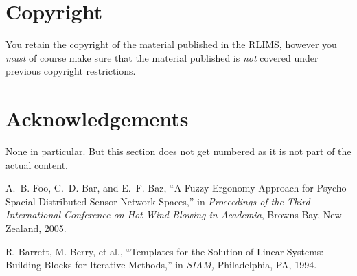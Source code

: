 \documentclass[a4paper,twoside]{arlims}
\begin{document}
\section{Copyright}
\label{sect:Copyright}

You retain the copyright of the material published in the RLIMS,
however you \emph{must} of course make sure that the material
published is \emph{not} covered under previous copyright restrictions.

\section*{Acknowledgements}

None in particular. But this section does not get numbered as it is
not part of the actual content.


\begin{thebibliography}{10}

  A.~B. Foo, C.~D. Bar, and E.~F. Baz, ``{A Fuzzy Ergonomy Approach for
  Psycho-Spacial Distributed Sensor-Network Spaces,}''
  in \emph{Proceedings of the Third International Conference on
  Hot Wind Blowing in Academia}, Browns Bay, New Zealand, 2005.

  R. Barrett, M. Berry, et al.,
  ``Templates for the Solution of Linear Systems: Building Blocks for
  Iterative Methods,'' in \emph{SIAM,} Philadelphia, PA, 1994.

\end{thebibliography}

% 
% 

\label{lastpagenum}
\end{document}
